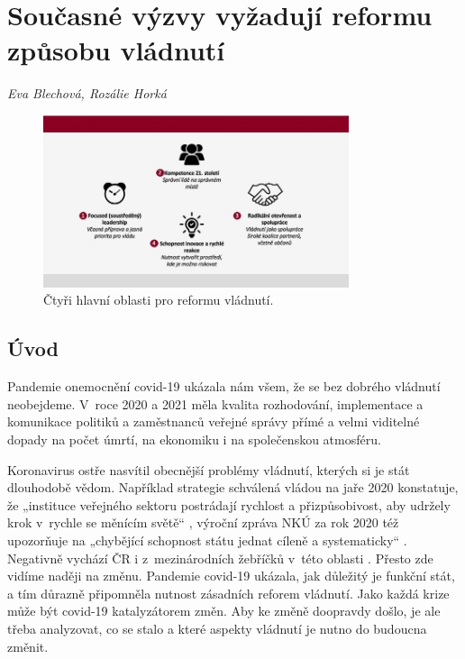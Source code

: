 
\chapter[Současné výzvy vyžadují reformu vládnutí]{Současné výzvy vyžadují reformu způsobu vládnutí}
\label{Nove_vyzvy}

\textit{Eva Blechová, Rozálie Horká}
\vspace{15mm}

\begin{figure}
    \centering
    \includegraphics[width=0.8\textwidth]{pic/evaschema.jpg}
    \caption{Čtyři hlavní oblasti pro reformu vládnutí.}
    \label{fig:ctyrioblasti}
\end{figure}

\section*{Úvod} 

Pandemie onemocnění covid-19 ukázala nám všem, že se bez dobrého vládnutí neobejdeme. V~roce 2020 a 2021 měla kvalita rozhodování, implementace a komunikace politiků a zaměstnanců veřejné správy přímé a velmi viditelné dopady na počet úmrtí, na ekonomiku i na společenskou atmosféru.

Koronavirus ostře nasvítil obecnější problémy vládnutí, kterých si je stát dlouhodobě vědom. Například strategie  schválená vládou na jaře 2020 konstatuje, že „instituce veřejného sektoru postrádají rychlost a přizpůsobivost, aby udržely krok v~rychle se měnícím světě“ \cite{ministerstvo_pro_mistni_rozvoj_cr_ministerstvo_2020}, výroční zpráva NKÚ za rok 2020 též upozorňuje na „chybějící schopnost státu jednat cíleně a systematicky“ \cite{nejvyssi-kontrolni-urad_vyrocni_2020}. Negativně vychází ČR i z~mezinárodních žebříčků v~této oblasti \cite{wef_global_2019}. Přesto zde vidíme naději na změnu. Pandemie covid-19 ukázala, jak důležitý je funkční stát, a tím důrazně připomněla nutnost zásadních reforem vládnutí. Jako každá krize může být covid-19 katalyzátorem změn. Aby ke změně doopravdy došlo, je ale třeba analyzovat, co se stalo a které aspekty vládnutí je nutno do budoucna změnit.

